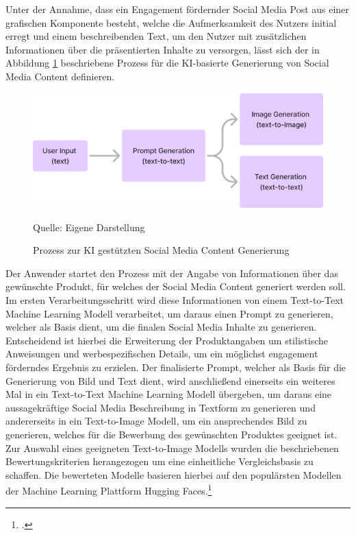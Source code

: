 Unter der Annahme, dass ein Engagement fördernder Social Media Post aus einer grafischen Komponente besteht, welche die Aufmerksamkeit des Nutzers initial erregt und einem beschreibenden Text, um den Nutzer mit zusätzlichen Informationen über die präsentierten Inhalte zu versorgen, lässt sich der in Abbildung \ref{fig:process_content_generation} beschriebene Prozess für die KI-basierte Generierung von Social Media Content definieren.
\begin{figure}[htbp]
    \centering
    \includegraphics[width=\textwidth]{abbildungen/Process_image_generation}
    \caption{Prozess zur KI gestützten Social Media Content Generierung}
    \label{fig:process_content_generation}
    \raggedright Quelle: Eigene Darstellung
\end{figure}

Der Anwender startet den Prozess mit der Angabe von Informationen über das gewünschte Produkt, für welches der Social Media Content generiert werden soll.
Im ersten Verarbeitungsschritt wird diese Informationen von einem Text-to-Text Machine Learning Modell verarbeitet, um daraus einen Prompt zu generieren, welcher als Basis dient, um die finalen Social Media Inhalte zu generieren.
Entscheidend ist hierbei die Erweiterung der Produktangaben um stilistische Anweisungen und werbespezifischen Details, um ein möglichst engagement förderndes Ergebnis zu erzielen.
Der finalisierte Prompt, welcher als Basis für die Generierung von Bild und Text dient, wird anschließend einerseits ein weiteres Mal in ein Text-to-Text Machine Learning Modell übergeben, um daraus eine aussagekräftige Social Media Beschreibung in Textform zu generieren und andererseits in ein Text-to-Image Modell, um ein ansprechendes Bild zu generieren, welches für die Bewerbung des gewünschten Produktes geeignet ist.
Zur Auswahl eines geeigneten Text-to-Image Modells wurden die beschriebenen Bewertungskriterien herangezogen um eine einheitliche Vergleichsbasis zu schaffen.
Die bewerteten Modelle basieren hierbei auf den populärsten Modellen der Machine Learning Plattform Hugging Faces.\footcite{huggingface_models}

